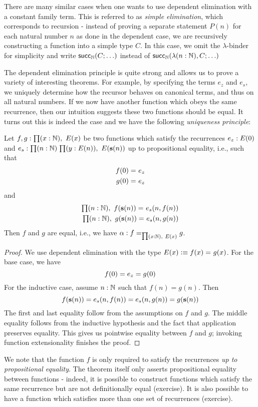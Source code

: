There are many similar cases when one wants to use dependent elimination with a constant family term. This is referred to as \emph{simple elimination}, which corresponds to recursion - instead of proving a separate statement $P(n)$ for each natural number $n$ as done in the dependent case, we are recursively constructing a function into a simple type $C$. In this case, we omit the $\lambda$-binder for simplicity and write $\mathsf{succ}_\mathbb{N}(C; \ldots)$ instead of $\mathsf{succ}_\mathbb{N}(\lambda (n : \mathbb{N}), C; \ldots)$

The dependent elimination principle is quite strong and allows us to prove a variety of interesting theorems. For example, by specifying the terms $e_z$ and $e_s$, we  uniquely determine how the recursor behaves on canonical terms, and thus on all natural numbers. If we now have another function which obeys the same recurrence, then our intuition suggests these two functions should be equal. It turns out this is indeed the case and we have the following \emph{uniqueness principle}:

\begin{thm}
Let $f,g : \prd{x:\nat} E(x)$ be two functions which satisfy the recurrences $e_z : E(0)$ and $e_s : \prd{n : \nat}{y : E(n)} E(\s(n))$ up to propositional equality, i.e., such that
\begin{align*}
f(0) =_{} e_z \\ 
g(0) =_{} e_z
\end{align*}
and 
\begin{align*}
\prd{n : \nat} \id{f(\s(n))}{e_s(n, f(n))} \\
\prd{n : \nat} \id{g(\s(n))}{e_s(n, g(n))}
\end{align*}
Then $f$ and $g$ are equal, i.e., we have $\alpha : \id[\prd{x :\nat} E(x)]{f}{g}$. 
\end{thm}

\begin{proof}
We use dependent elimination with the type $E(x) \vcentcolon\equiv f(x) =_{} g(x)$. For the base case, we have \[f(0) = e_z = g(0)\]
For the inductive case, assume $n : \mathbb{N}$ such that $f(n) = g(n)$. Then
\[ f(\mathbf{s}(n)) = e_s(n, f(n)) = e_s(n, g(n)) = g(\mathbf{s}(n)) \]
The first and last equality follow from the assumptions on $f$ and $g$. The middle equality follows from the inductive hypothesis and the fact that application preserves equality. This gives us pointwise equality between $f$ and $g$; invoking function extensionality finishes the proof.
\end{proof}
We note that the function $f$ is only required to satisfy the recurrences \emph{up to propositional equality}. The theorem itself only asserts propositional equality between functions - indeed, it is possible to construct functions which satisfy the same recurrence but are not definitionally equal (exercise). It is also possible to have a function which satisfies more than one set of recurrences (exercise).

